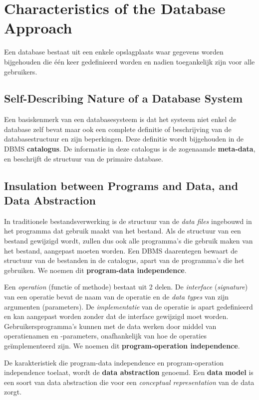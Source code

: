 \newpage
\section{Characteristics of the Database Approach}
Een database bestaat uit een enkele opslagplaats waar gegevens worden bijgehouden die \'e\'en keer gedefinieerd worden en nadien toegankelijk zijn voor alle gebruikers. 

\subsection{Self-Describing Nature of a Database System}
Een basiskenmerk van een databasesysteem is dat het systeem niet enkel de database zelf bevat maar ook een complete definitie of beschrijving van de databasestructuur en zijn beperkingen. Deze definitie wordt bijgehouden in de DBMS \textbf{catalogus}. De informatie in deze catalogus is de zogenaamde \textbf{meta-data}, en beschrijft de structuur van de primaire database.

\subsection{Insulation between Programs and Data, and Data Abstraction}
In traditionele bestandsverwerking is de structuur van de \textit{data files} ingebouwd in het programma dat gebruik maakt van het bestand. Als de structuur van een bestand gewijzigd wordt, zullen dus ook alle programma's die gebruik maken van het bestand, aangepast moeten worden. Een DBMS daarentegen bewaart de structuur van de bestanden in de catalogus, apart van de programma's die het gebruiken. We noemen dit \textbf{program-data independence}. 

Een \textit{operation} (functie of methode) bestaat uit 2 delen. De \textit{interface} (\textit{signature}) van een operatie bevat de naam van de operatie en de \textit{data types} van zijn argumenten (parameters). De \textit{implementatie} van de operatie is apart gedefinieerd en kan aangepast worden zonder dat de interface gewijzigd moet worden. Gebruikersprogramma's kunnen met de data werken door middel van operatienamen en -parameters, onafhankelijk van hoe de operaties ge\"implementeerd zijn. We noemen dit \textbf{program-operation independence}.

De karakteristiek die program-data independence en program-operation independence toelaat, wordt de \textbf{data abstraction} genoemd. Een \textbf{data model} is een soort van data abstraction die voor een \textit{conceptual representation} van de data zorgt.

